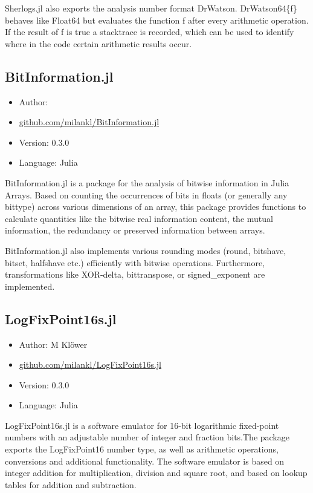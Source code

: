 Sherlogs.jl also exports the analysis number format DrWatson. DrWatson64\{f\} behaves like Float64 but evaluates the function f after every arithmetic operation.
If the result of f is true a stacktrace is recorded, which can be used to identify where in the code certain arithmetic results occur.

\subsection{BitInformation.jl}

\begin{itemize}
    \setlength\itemsep{-5pt}
    \item Author: \cite{Klower2021i}
    \item \href{https://github.com/milankl/BitInformation.jl}{github.com/milankl/BitInformation.jl}
    \item Version: 0.3.0
    \item Language: Julia
\end{itemize}

BitInformation.jl is a package for the analysis of bitwise information in Julia Arrays. Based on counting the occurrences of bits in floats (or generally any bittype)
across various dimensions of an array, this package provides functions to calculate quantities like the bitwise real information content, the mutual information,
the redundancy or preserved information between arrays.

BitInformation.jl also implements various rounding modes (round, bitshave, bitset, halfshave etc.) efficiently with bitwise operations. Furthermore, transformations like XOR-delta, bittranspose, or signed\_exponent are implemented.

\subsection{LogFixPoint16s.jl}

\begin{itemize}
    \setlength\itemsep{-5pt}
    \item Author: M Klöwer
    \item \href{https://github.com/milankl/LogFixPoint16s.jl}{github.com/milankl/LogFixPoint16s.jl}
    \item Version: 0.3.0
    \item Language: Julia
\end{itemize}

LogFixPoint16s.jl is a software emulator for 16-bit logarithmic fixed-point numbers with an adjustable number of integer and fraction bits.The package exports the
LogFixPoint16 number type, as well as arithmetic operations, conversions and additional functionality. The software emulator is based on integer addition for
multiplication, division and square root, and based on lookup tables for addition and subtraction.

